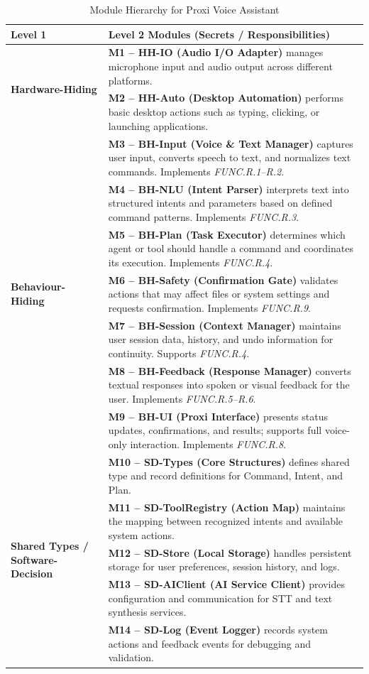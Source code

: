 \documentclass[12pt, titlepage]{article}
\begin{document}
\begin{table}[H]
\centering
\caption{Module Hierarchy for Proxi Voice Assistant}
\label{TblMH}
\renewcommand{\arraystretch}{1.2}
\begin{tabular}{p{} p{}}
\toprule
\textbf{Level 1} & \textbf{Level 2 Modules (Secrets / Responsibilities)}\\
\midrule

\multirow{2}{*}{\textbf{Hardware-Hiding}} &
\textbf{M1 -- HH-IO (Audio I/O Adapter)} manages microphone input and audio
output across different platforms.\\
& \textbf{M2 -- HH-Auto (Desktop Automation)} performs basic desktop actions
such as typing, clicking, or launching applications.\\
\midrule

\multirow{7}{*}{\textbf{Behaviour-Hiding}} &
\textbf{M3 -- BH-Input (Voice \& Text Manager)} captures user input,
converts speech to text, and normalizes text commands. Implements
\textit{FUNC.R.1–R.2}.\\
& \textbf{M4 -- BH-NLU (Intent Parser)} interprets text into structured
intents and parameters based on defined command patterns. Implements
\textit{FUNC.R.3}.\\
& \textbf{M5 -- BH-Plan (Task Executor)} determines which agent or tool
should handle a command and coordinates its execution. Implements
\textit{FUNC.R.4}.\\
& \textbf{M6 -- BH-Safety (Confirmation Gate)} validates actions that may
affect files or system settings and requests confirmation. Implements
\textit{FUNC.R.9}.\\
& \textbf{M7 -- BH-Session (Context Manager)} maintains user session data,
history, and undo information for continuity. Supports \textit{FUNC.R.4}.\\
& \textbf{M8 -- BH-Feedback (Response Manager)} converts textual responses
into spoken or visual feedback for the user. Implements
\textit{FUNC.R.5–R.6}.\\
& \textbf{M9 -- BH-UI (Proxi Interface)} presents status updates,
confirmations, and results; supports full voice-only interaction.
Implements \textit{FUNC.R.8}.\\
\midrule

\multirow{5}{*}{\textbf{Shared Types / Software-Decision}} &
\textbf{M10 -- SD-Types (Core Structures)} defines shared type and record definitions for
Command, Intent, and Plan.\\
& \textbf{M11 -- SD-ToolRegistry (Action Map)} maintains the mapping between
recognized intents and available system actions.\\
& \textbf{M12 -- SD-Store (Local Storage)} handles persistent storage for user
preferences, session history, and logs.\\
& \textbf{M13 -- SD-AIClient (AI Service Client)} provides configuration and
communication for STT and text synthesis services.\\
& \textbf{M14 -- SD-Log (Event Logger)} records system actions and feedback
events for debugging and validation.\\
\bottomrule
\end{tabular}
\end{table}
\end{document}
